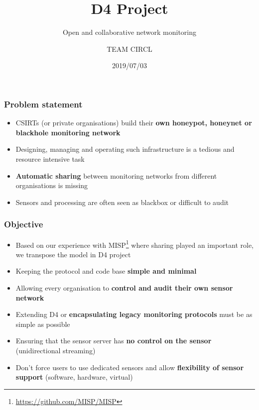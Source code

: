\documentclass{beamer}
\title{D4 Project}
\subtitle{Open and collaborative network monitoring}
\author{TEAM CIRCL}
\institute{Team CIRCL \\ \url{https://www.d4-project.org/}}
\date{2019/07/03}
\begin{document}
    \begin{frame}
        \maketitle
    \end{frame}

\begin{frame}
        \frametitle{Problem statement}
        \begin{itemize}
                \item CSIRTs (or private organisations) build their {\bf own honeypot, honeynet or blackhole monitoring network}
                \item Designing, managing and operating such infrastructure is a tedious and resource intensive task
                \item {\bf Automatic sharing} between monitoring networks from different organisations is missing
                \item Sensors and processing are often seen as blackbox or difficult to audit

        \end{itemize}
\end{frame}


\begin{frame}
 \frametitle{Objective}
 \begin{itemize}
         \item Based on our experience with
           MISP\footnote{\url{https://github.com/MISP/MISP}} where sharing
           played an important role, we transpose the model in D4 project
         \item Keeping the protocol and code base {\bf simple and minimal}
         \item Allowing every organisation to {\bf control and audit their own sensor network}
         \item Extending D4 or {\bf encapsulating legacy monitoring protocols} must be as simple as possible
         \item Ensuring that the sensor server has {\bf no control on the sensor} (unidirectional streaming)
         \item Don't force users to use dedicated sensors and allow {\bf flexibility of sensor support} (software, hardware, virtual)

 \end{itemize}
\end{frame}
\end{document}
